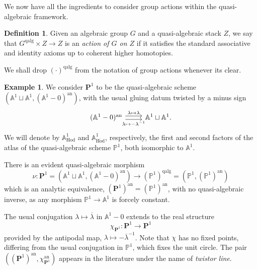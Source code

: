 \documentclass[11pt, a4paper]{amsart}
\numberwithin{equation}{section}
\theoremstyle{definition}
\newtheorem{definition}[theorem]{Definition}
\newtheorem{example}[theorem]{Example}
\theoremstyle{remark}
\DeclareMathOperator{\an}{an}
\DeclareMathOperator{\Hod}{Hod}
\DeclareMathOperator{\qalg}{\mathrm{qalg}}
\renewcommand{\P}{\mathbf{P}}
\newcommand{\ol}[1]{\overline{#1}}
\renewcommand{\AA}{\mathbb{A}}
\newcommand{\PP}{\mathbb{P}}
\renewcommand{\to}{\longrightarrow}
\begin{document}
We now have all the ingredients to consider group actions within the quasi-algebraic framework.

\begin{definition}
Given an algebraic group $G$ and a quasi-algebraic stack $Z$, we say that $G^{\qalg} \times Z \to Z$ is an {\it action of $G$ on $Z$} if it satisfies the standard associative and identity axioms up to coherent higher homotopies.
\end{definition}

We shall drop $(\cdot)^{\qalg}$ from the notation of group actions whenever its clear.



\begin{example}%
\label{ex PP^1 qalg}
We consider $\P^1$ to be the quasi-algebraic scheme $(\AA^1 \sqcup \AA^1, (\AA^1 - 0)^{\an})$, with the usual gluing datum twisted by a minus sign
\[\begin{tikzcd}
	{(\mathbb{A}^1-0)^{\mathrm{an}}} & {\mathbb{A}^1 \sqcup \mathbb{A}^1}
	\arrow["{\lambda \mapsto -\lambda^{-1}}"', shift right, from=1-1, to=1-2]
	\arrow["{\lambda \mapsto \lambda}", shift left, from=1-1, to=1-2].
\end{tikzcd}\]
We will denote by $\AA^1_{\Hod}$ and $\AA^1_{\ol \Hod}$, respectively, the first and second factors of the atlas of the quasi-algebraic scheme $\PP^1$, both isomorphic to $\AA^1$.

There is an evident quasi-algebraic morphism
\begin{equation} \label{eq nu morphism}
\nu : \P^1 = (\AA^1 \sqcup \AA^1, (\AA^1-0)^{\mathrm{an}}) \to (\PP^1)^{\qalg} = (\PP^1, (\PP^1)^{\mathrm{an}})
\end{equation}
which is an analytic equivalence, $(\P^1)^{\an} = (\PP^1)^{\an}$, with no quasi-algebraic inverse, as any morphism $\PP^1 \to \AA^1$ is forcely constant.

The usual conjugation $\lambda \mapsto \ol\lambda$ in $\AA^1 - 0$ extends to the real structure 
\begin{equation} \label{eq chi P^1}
\chi_{\P^1} : \P^1 \to \P^1 
\end{equation}
provided by the antipodal map, $\lambda \mapsto - \ol{\lambda}^{-1}$. Note that $\chi$ has no fixed points, differing from the usual conjugation in $\PP^1$, which fixes the unit circle. The pair $((\P^1)^{\an}, \chi_{\P^1}^{\an})$ appears in the literature under the name of {\it twistor line}.
\end{example}
\end{document}
